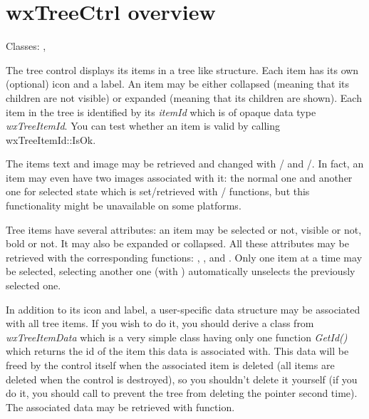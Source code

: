\section{wxTreeCtrl overview}\label{wxtreectrloverview}

Classes: , 

The tree control displays its items in a tree like structure. Each item has its
own (optional) icon and a label. An item may be either collapsed (meaning that
its children are not visible) or expanded (meaning that its children are
shown). Each item in the tree is identified by its {\it itemId} which is of
opaque data type {\it wxTreeItemId}. You can test whether an item is valid
by calling wxTreeItemId::IsOk.

The items text and image may be retrieved and changed with 
/ 
and 
/.
In fact, an item may even have two images associated with it: the normal one
and another one for selected state which is set/retrieved with 
/ 
functions, but this functionality might be unavailable on some platforms.

Tree items have several attributes: an item may be selected or not, visible or
not, bold or not. It may also be expanded or collapsed. All these attributes
may be retrieved with the corresponding functions: 
, 
,  
and . Only one item at a time may be
selected, selecting another one (with 
) automatically unselects the
previously selected one.

In addition to its icon and label, a user-specific data structure may be associated
with all tree items. If you wish to do it, you should derive a class from {\it
wxTreeItemData} which is a very simple class having only one function {\it
GetId()} which returns the id of the item this data is associated with. This
data will be freed by the control itself when the associated item is deleted
(all items are deleted when the control is destroyed), so you shouldn't delete
it yourself (if you do it, you should call 
 to prevent the tree from
deleting the pointer second time). The associated data may be retrieved with 
 function.

